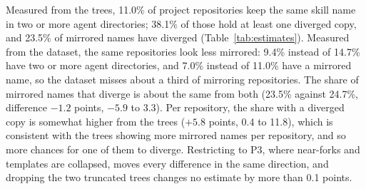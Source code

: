 Measured from the trees, 11.0\% of project repositories keep the same skill name in two or more agent directories;
38.1\% of those hold at least one diverged copy, and 23.5\% of mirrored names have diverged (Table~\ref{tab:estimates}).
Measured from the dataset, the same repositories look less mirrored: 9.4\% instead of 14.7\% have two or more agent
directories, and 7.0\% instead of 11.0\% have a mirrored name, so the dataset misses about a third of mirroring
repositories. The share of mirrored names that diverge is about the same from both (23.5\% against 24.7\%, difference $-1.2$
points, $-5.9$ to 3.3). Per repository, the share with a diverged copy is somewhat higher from the trees ($+5.8$
points, 0.4 to 11.8), which is consistent with the trees showing more mirrored names per repository, and so more
chances for one of them to diverge. Restricting to P3, where near-forks and templates are collapsed, moves every
difference in the same direction, and dropping the two truncated trees changes no estimate by more than 0.1 points.
